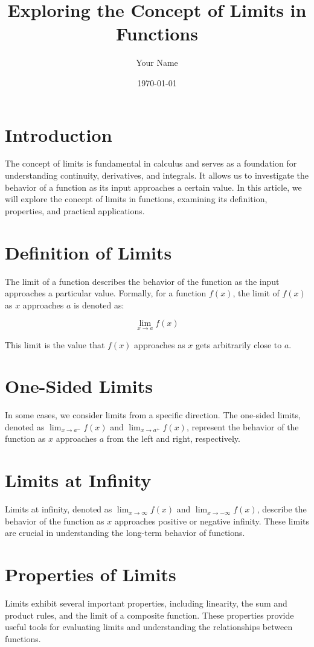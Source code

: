 \documentclass{article}
\title{Exploring the Concept of Limits in Functions}
\author{Your Name}
\date{\today}
\begin{document}
\maketitle

\section*{Introduction}
The concept of limits is fundamental in calculus and serves as a foundation for understanding continuity, derivatives, and integrals. It allows us to investigate the behavior of a function as its input approaches a certain value. In this article, we will explore the concept of limits in functions, examining its definition, properties, and practical applications.

\section*{Definition of Limits}
The limit of a function describes the behavior of the function as the input approaches a particular value. Formally, for a function $f(x)$, the limit of $f(x)$ as $x$ approaches $a$ is denoted as:

\[
\lim_{{x \to a}} f(x)
\]

This limit is the value that $f(x)$ approaches as $x$ gets arbitrarily close to $a$.

\section*{One-Sided Limits}
In some cases, we consider limits from a specific direction. The one-sided limits, denoted as $\lim_{{x \to a^-}} f(x)$ and $\lim_{{x \to a^+}} f(x)$, represent the behavior of the function as $x$ approaches $a$ from the left and right, respectively.

\section*{Limits at Infinity}
Limits at infinity, denoted as $\lim_{{x \to \infty}} f(x)$ and $\lim_{{x \to -\infty}} f(x)$, describe the behavior of the function as $x$ approaches positive or negative infinity. These limits are crucial in understanding the long-term behavior of functions.

\section*{Properties of Limits}
Limits exhibit several important properties, including linearity, the sum and product rules, and the limit of a composite function. These properties provide useful tools for evaluating limits and understanding the relationships between functions.
\end{document}
